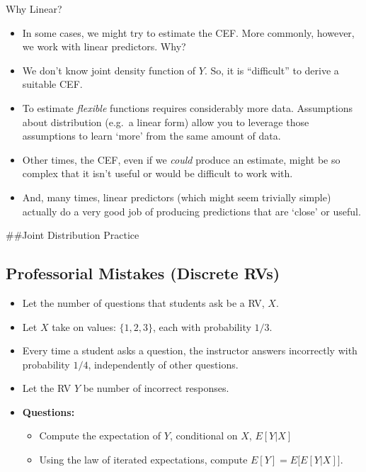 \documentclass[
]{book}
\providecommand{\tightlist}{%
  \setlength{\itemsep}{0pt}\setlength{\parskip}{0pt}}
\theoremstyle{definition}
\theoremstyle{definition}
\theoremstyle{definition}
\theoremstyle{definition}
\theoremstyle{remark}
\begin{document}
Why Linear?

\begin{itemize}
\item
  In some cases, we might try to estimate the CEF. More commonly, however, we work with linear predictors. Why?
\item
  We don't know joint density function of \(Y\). So, it is ``difficult'' to derive a suitable CEF.
\item
  To estimate \emph{flexible} functions requires considerably more data. Assumptions about distribution (e.g.~a linear form) allow you to leverage those assumptions to learn `more' from the same amount of data.
\item
  Other times, the CEF, even if we \emph{could} produce an estimate, might be so complex that it isn't useful or would be difficult to work with.
\item
  And, many times, linear predictors (which might seem trivially simple) actually do a very good job of producing predictions that are `close' or useful.
\end{itemize}

\#\#Joint Distribution Practice

\hypertarget{professorial-mistakes-discrete-rvs}{%
\subsection{Professorial Mistakes (Discrete RVs)}\label{professorial-mistakes-discrete-rvs}}

\begin{itemize}
\item
  Let the number of questions that students ask be a RV, \(X\).\\
\item
  Let \(X\) take on values: \(\{1, 2, 3\}\), each with probability \(1/3\).\\
\item
  Every time a student asks a question, the instructor answers incorrectly with probability \(1/4\), independently of other questions.
\item
  Let the RV \(Y\) be number of incorrect responses.
\item
  \textbf{Questions:}

  \begin{itemize}
  \tightlist
  \item
    Compute the expectation of \(Y\), conditional on \(X\), \(E[Y|X]\)
  \item
    Using the law of iterated expectations, compute \(E[Y] = E\big[E[Y|X]\big]\).
  \end{itemize}
\end{itemize}
\end{document}
